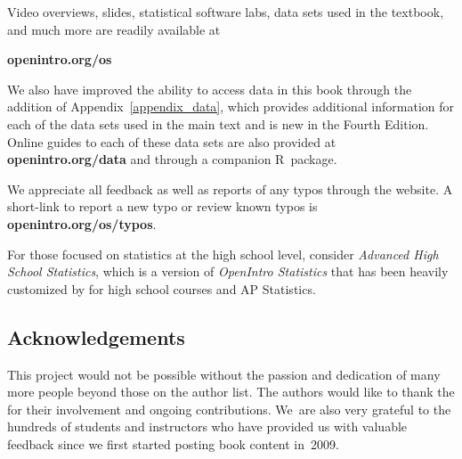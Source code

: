 Video overviews, slides, statistical software labs,
data sets used in the textbook,
and much more are readily available at\\[-5mm]
\begin{center}
    {\color{black}\textbf{openintro.org/os}}
\end{center}
We also have improved the ability to access data in this book
through the addition of Appendix~\ref{appendix_data},
which provides additional information for each of the data sets
used in the main text and is new in the Fourth Edition.
Online guides to each of these data sets are also provided at
    {\color{black}\textbf{openintro.org/data}}
and through a
    {companion R~package}.
\vspace{3mm}

\noindent%
We appreciate all feedback as well as reports of any
typos through the website.
A short-link to report a new typo or review known typos is
    {\color{black}\textbf{openintro.org/os/typos}}. \vspace{3mm}

\noindent%
For those focused on statistics at the high school level,
consider
    {\emph{Advanced High School Statistics}},
which is a version of \emph{OpenIntro Statistics} that has
been heavily customized by 
for high school courses and
AP\textsuperscript{\textregistered} Statistics.


\subsection*{{\color{oiB}Acknowledgements}}
This project would not be possible without the passion and
dedication of many more people beyond those on the author list.
The authors would like to thank the
for their involvement and ongoing contributions.
We~are also very grateful to the hundreds of students
and instructors who have provided us with valuable feedback
since we first started posting book content in~2009. \vspace{3mm}

